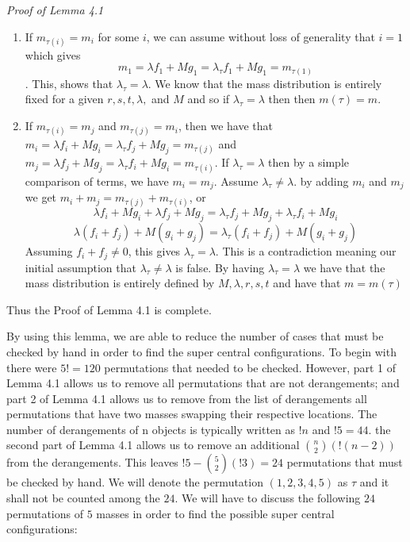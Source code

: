 \documentclass[11pt,leqno]{article}
\theoremstyle{definition}
\theoremstyle{remark}
\numberwithin{equation}{section}
\begin{document}
\textit{Proof of Lemma 4.1}
\begin{enumerate}
\item If $m_{\tau(i)}=m_i$ for some $i$, we can assume without loss of generality that $i=1$ which gives
$$ m_1=\lambda f_1+M g_1=\lambda_\tau f_1+M g_1=m_{\tau(1)}$$. This, shows that $\lambda_\tau=\lambda$. We know that the mass distribution is entirely fixed for a given $r,s,t,\lambda,$ and $M$ and so if $\lambda_\tau=\lambda$ then then $m(\tau)=m$.

\item If $m_{\tau(i)}=m_j$ and $m_{\tau(j)}=m_i$, then we have that $m_i=\lambda f_i +M g_i=\lambda_\tau f_j + M g_j=m_{\tau(j)}$ and $m_j=\lambda f_j +M g_j=\lambda_\tau f_i + M g_i=m_{\tau(i)}$. If $\lambda_\tau=\lambda$ then by a simple comparison of terms, we have $m_i=m_j$. Assume $\lambda_\tau \neq \lambda$. by adding $m_i$ and $m_j$ we get $m_i+m_j=m_{\tau(j)}+m_{\tau(i)}$, or 
$$\lambda f_i +M g_i+\lambda f_j +M g_j=\lambda_\tau f_j +M g_j+\lambda_\tau f_i + M g_i $$
$$\lambda (f_i +f_j) +M (g_i+g_j)=\lambda_\tau (f_i+f_j)+M(g_i+g_j)$$
Assuming $f_i+f_j \neq 0$, this gives $\lambda_\tau=\lambda$. This is a contradiction meaning our initial assumption that $\lambda_\tau \neq \lambda$ is false. By having $\lambda_\tau=\lambda$ we have that the mass distribution is entirely defined by $M, \lambda, r,s,t$ and have that $m=m(\tau)$
\end{enumerate}
Thus the Proof of Lemma 4.1 is complete.

By using this lemma, we are able to reduce the number of cases that must be checked by hand in order to find the super central configurations. To begin with there were $5!=120$ permutations that needed to be checked. 
However, part 1 of Lemma 4.1 allows us to remove all permutations that are not derangements; and part 2 of Lemma 4.1 allows us to remove from the list of derangements all permutations that have two masses swapping their respective locations. 
The number of derangements of n objects is typically written as $!n$ and $!5=44$. the second part of Lemma 4.1 allows us to remove an additional ${n \choose 2} (!(n-2))$ from the derangements. 
This leaves $!5-{5\choose 2}(!3)=24$ permutations that must be checked by hand. We will denote the permutation $(1,2,3,4,5)$ as $\tau$ and it shall not be counted among the $24$. We will have to discuss the following $24$ permutations of $5$ masses in order to find the possible super central configurations:
\end{document}
